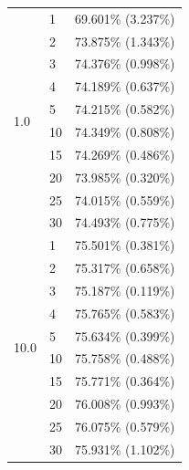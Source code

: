 \documentclass[conference,compsoc]{IEEEtran}
\begin{document}
\begin{table}[ht]
\begin{tabular}{lll}
    \hline
    \multirow{10}{*}{1.0} & 1 & 69.601\% (3.237\%) \\
    & 2 & 73.875\% (1.343\%) \\
    & 3 & 74.376\% (0.998\%) \\
    & 4 & 74.189\% (0.637\%) \\
    & 5 & 74.215\% (0.582\%) \\
    & 10 & 74.349\% (0.808\%) \\
    & 15 & 74.269\% (0.486\%) \\
    & 20 & 73.985\% (0.320\%) \\
    & 25 & 74.015\% (0.559\%) \\
    & 30 & 74.493\% (0.775\%) \\
    \hline
    \multirow{10}{*}{10.0} & 1 & 75.501\% (0.381\%) \\
    & 2 & 75.317\% (0.658\%) \\
    & 3 & 75.187\% (0.119\%) \\
    & 4 & 75.765\% (0.583\%) \\
    & 5 & 75.634\% (0.399\%) \\
    & 10 & 75.758\% (0.488\%) \\
    & 15 & 75.771\% (0.364\%) \\
    & 20 & 76.008\% (0.993\%) \\
    & 25 & 76.075\% (0.579\%) \\
    & 30 & 75.931\% (1.102\%) \\
    \hline
    \end{tabular}
\end{table}
\end{document}
